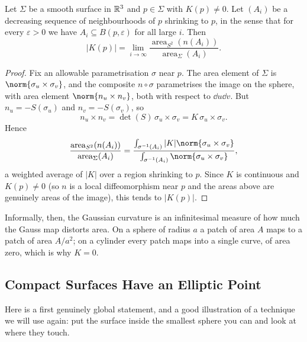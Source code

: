 \documentclass[a4paper]{scrartcl}
\begin{document}
\begin{theorem}
    Let $\Sigma$ be a smooth surface in $\mathbb{R}^3$ and $p \in \Sigma$ with $K(p) \neq 0$. Let $(A_i)$ be a decreasing sequence of neighbourhoods of $p$ shrinking to $p$, in the sense that for every $\varepsilon>0$ we have $A_i \subseteq B(p,\varepsilon)$ for all large $i$. Then
    $$
    |K(p)| = \lim_{i \to \infty}\frac{\operatorname{area}_{S^2}(n(A_i))}{\operatorname{area}_\Sigma(A_i)}.
    $$
\end{theorem}
\begin{proof}
    Fix an allowable parametrisation $\sigma$ near $p$. The area element of $\Sigma$ is $\norm{\sigma_u \times \sigma_v}$, and the composite $n\circ\sigma$ parametrises the image on the sphere, with area element $\norm{n_u \times n_v}$, both with respect to $\dd u \dd v$. But $n_u = -S(\sigma_u)$ and $n_v = -S(\sigma_v)$, so
    $$
    n_u \times n_v = \det(S)\, \sigma_u \times \sigma_v = K\, \sigma_u\times\sigma_v.
    $$
    Hence
    $$
    \frac{\operatorname{area}_{S^2}(n(A_i))}{\operatorname{area}_\Sigma(A_i)} = \frac{\int_{\sigma^{-1}(A_i)} |K| \norm{\sigma_u\times\sigma_v}}{\int_{\sigma^{-1}(A_i)}\norm{\sigma_u\times\sigma_v}},
    $$
    a weighted average of $|K|$ over a region shrinking to $p$. Since $K$ is continuous and $K(p)\neq 0$ (so $n$ is a local diffeomorphism near $p$ and the areas above are genuinely areas of the image), this tends to $|K(p)|$.
\end{proof}

Informally, then, the Gaussian curvature is an infinitesimal measure of how much the Gauss map distorts area. On a sphere of radius $a$ a patch of area $A$ maps to a patch of area $A/a^2$; on a cylinder every patch maps into a single curve, of area zero, which is why $K = 0$.

\subsection{Compact Surfaces Have an Elliptic Point}

Here is a first genuinely global statement, and a good illustration of a technique we will use again: put the surface inside the smallest sphere you can and look at where they touch.
\end{document}
